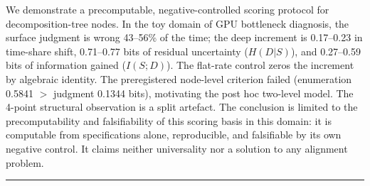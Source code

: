 \documentclass[10pt]{article}
\begin{document}
We demonstrate a precomputable, negative-controlled scoring protocol for decomposition-tree nodes. In the toy domain of GPU bottleneck diagnosis, the surface judgment is wrong 43--56\% of the time; the deep increment is 0.17--0.23 in time-share shift, 0.71--0.77 bits of residual uncertainty ($H(D|S)$), and 0.27--0.59 bits of information gained ($I(S;D)$). The flat-rate control zeros the increment by algebraic identity. The preregistered node-level criterion failed (enumeration 0.5841 $>$ judgment 0.1344 bits), motivating the post hoc two-level model. The 4-point structural observation is a split artefact. The conclusion is limited to the precomputability and falsifiability of this scoring basis in this domain: it is computable from specifications alone, reproducible, and falsifiable by its own negative control. It claims neither universality nor a solution to any alignment problem.

\begin{center}\rule{0.5\linewidth}{0.5pt}\end{center}




\end{document}
